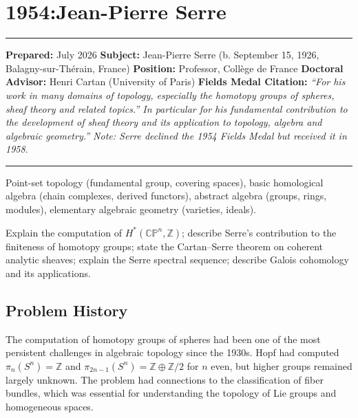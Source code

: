 \chapter{1954:Jean-Pierre Serre}\label{ch1954jeanpierreserre:jean-pierre-serre-fields-medal-1954-a-comprehensive-report}

\begin{center}\rule{0.5\linewidth}{0.5pt}\end{center}

\textbf{Prepared:} July 2026 \textbf{Subject:} Jean-Pierre Serre (b. September 15,
1926, Balagny-sur-Thérain, France) \textbf{Position:} Professor, Collège de France
\textbf{Doctoral Advisor:} Henri Cartan (University of Paris)
\textbf{Fields Medal Citation:} \emph{``For his work in many domains of topology,
especially the homotopy groups of spheres, sheaf theory and related topics.''
In particular for his fundamental contribution to the development of sheaf theory
and its application to topology, algebra and algebraic geometry.''
Note: Serre declined the 1954 Fields Medal but received it in 1958.}

\begin{center}\rule{0.5\linewidth}{0.5pt}\end{center}

\begin{prereqs} Point-set topology (fundamental group, covering spaces), basic homological algebra (chain complexes, derived functors), abstract algebra (groups, rings, modules), elementary algebraic geometry (varieties, ideals). \end{prereqs}

\begin{objectives} Explain the computation of $H^*(\mathbb{CP}^n, \mathbb{Z})$; describe Serre's contribution to the finiteness of homotopy groups; state the Cartan--Serre theorem on coherent analytic sheaves; explain the Serre spectral sequence; describe Galois cohomology and its applications. \end{objectives}

\section{Problem History}

The computation of homotopy groups of spheres had been one of the most persistent challenges in algebraic topology since the 1930s. Hopf had computed $\pi_n(S^n) = \mathbb{Z}$ and $\pi_{2n-1}(S^n) = \mathbb{Z} \oplus \mathbb{Z}/2$ for $n$ even, but higher groups remained largely unknown. The problem had connections to the classification of fiber bundles, which was essential for understanding the topology of Lie groups and homogeneous spaces.

